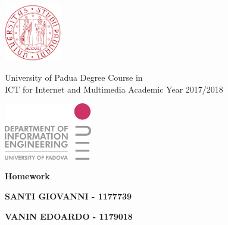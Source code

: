 \documentclass[a4paper,11pt,openright,twoside]{report}
\begin{document}
\begin{minipage}[b]{0.20\textwidth}    %
	\centering
	\includegraphics[height=2.5cm]{images/unipd}
\end{minipage}%
\begin{minipage}[b][2cm]{0.6\textwidth}
	\centering\large \sc
	University of Padua \vfill
	Degree Course in \\ ICT for Internet and Multimedia\vfill
	\small Academic Year 2017/2018 \end{minipage}%
\begin{minipage}[b]{0.20\textwidth}
	\centering 
	\includegraphics[height=2.5cm]{images/dei}
\end{minipage}

\vspace*{20pt}
\begin{center}\leavevmode
	\normalfont
	{\huge\raggedleft \bfseries\textsf{  Homework}\par}%
	\hrulefill\par
	{\LARGE\raggedright \textsf{\bfseries SANTI GIOVANNI - 1177739}\par}%
	\vspace*{20pt}
	{\LARGE\raggedright \textsf{\bfseries VANIN EDOARDO - 1179018}\par}%
	\vspace*{20pt}
\end{center}	
\end{document}
